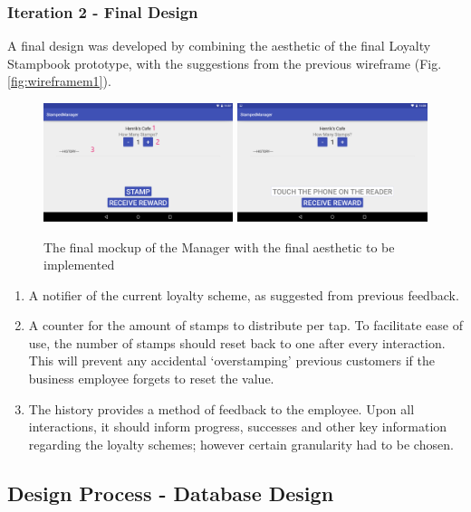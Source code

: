 \subsubsection{Iteration 2 - Final Design}
A final design was developed by combining the aesthetic of the final Loyalty Stampbook prototype, with the suggestions from the previous wireframe  (Fig. \ref{fig:wireframem1}).
\begin{figure}[H]
 \centering
  \includegraphics[width=0.494\textwidth]{img/readerfinalmock2.png}
   \includegraphics[width=0.494\textwidth]{img/readerfinalmock1.png}
     \caption{The final mockup of the Manager with the final aesthetic to be implemented}
     \label{fig:wireframem2}
\end{figure}

\begin{enumerate}
  \item A notifier of the current loyalty scheme, as suggested from previous feedback.
  \item A counter for the amount of stamps to distribute per tap. To facilitate ease of use, the number of stamps should reset back to one after every interaction. This will prevent any accidental `overstamping' previous customers if the business employee forgets to reset the value.
  \item The history provides a method of feedback to the employee. Upon all interactions, it should inform progress, successes and other key information regarding the loyalty schemes; however certain granularity had to be chosen.
\end{enumerate}

\newpage
\subsection{Design Process - Database Design}

